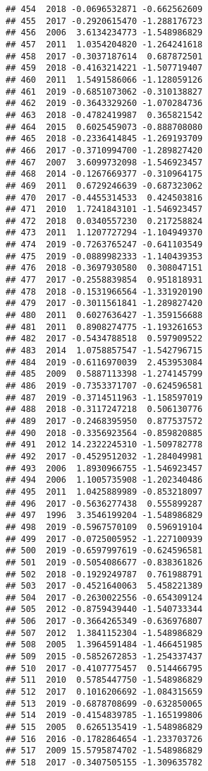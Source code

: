 \documentclass[
]{article}
\begin{document}
\begin{verbatim}
## 454  2018 -0.0696532871 -0.662562609
## 455  2017 -0.2920615470 -1.288176723
## 456  2006  3.6134234773 -1.548986829
## 457  2011  1.0354204820 -1.264241618
## 458  2017 -0.3037187614  0.687872501
## 459  2018 -0.4163214221 -1.507719407
## 460  2011  1.5491586066 -1.128059126
## 461  2019 -0.6851073062 -0.310138827
## 462  2019 -0.3643329260 -1.070284736
## 463  2018 -0.4782419987  0.365821542
## 464  2015  0.6025459073 -0.888708080
## 465  2018 -0.2336414845 -1.269193709
## 466  2017 -0.3710994700 -1.289827420
## 467  2007  3.6099732098 -1.546923457
## 468  2014 -0.1267669377 -0.310964175
## 469  2011  0.6729246639 -0.687323062
## 470  2017 -0.4455314533  0.424503816
## 471  2010  1.7241843101 -1.546923457
## 472  2018  0.0340557230  0.217258824
## 473  2011  1.1207727294 -1.104949370
## 474  2019 -0.7263765247 -0.641103549
## 475  2019 -0.0889982333 -1.140439353
## 476  2018 -0.3697930580  0.308047151
## 477  2017 -0.2558839854  0.951818931
## 478  2018 -0.1531966564 -1.331920190
## 479  2017 -0.3011561841 -1.289827420
## 480  2011  0.6027636427 -1.359156688
## 481  2011  0.8908274775 -1.193261653
## 482  2017 -0.5434788518  0.597909522
## 483  2014  1.0758857547 -1.542796715
## 484  2019 -0.6116970039  2.453953084
## 485  2009  0.5887113398 -1.274145799
## 486  2019 -0.7353371707 -0.624596581
## 487  2019 -0.3714511963 -1.158597019
## 488  2018 -0.3117247218  0.506130776
## 489  2017 -0.2468395950  0.877537572
## 490  2018 -0.3356923564 -0.859820885
## 491  2012 14.2322245310 -1.509782778
## 492  2017 -0.4529512032 -1.284049981
## 493  2006  1.8930966755 -1.546923457
## 494  2006  1.1005735908 -1.202340486
## 495  2011  1.0425889989 -0.853218097
## 496  2017 -0.5636277438  0.555899287
## 497  1996  3.3546199204 -1.548986829
## 498  2019 -0.5967570109  0.596919104
## 499  2017 -0.0725005952 -1.227100939
## 500  2019 -0.6597997619 -0.624596581
## 501  2019 -0.5054086677 -0.838361826
## 502  2018 -0.1929249787  0.761988791
## 503  2017 -0.4521640063  5.458221389
## 504  2017 -0.2630022556 -0.654309124
## 505  2012 -0.8759439440 -1.540733344
## 506  2017 -0.3664265349 -0.636976807
## 507  2012  1.3841152304 -1.548986829
## 508  2005  1.3964591484 -1.466451985
## 509  2015 -0.5852672853 -1.254337437
## 510  2017 -0.4107775457  0.514466795
## 511  2010  0.5785447750 -1.548986829
## 512  2017  0.1016206692 -1.084315659
## 513  2019 -0.6878708699 -0.632850065
## 514  2019 -0.4154839785 -1.165199806
## 515  2005  0.6265135419 -1.548986829
## 516  2016 -0.1782864654 -1.233703726
## 517  2009 15.5795874702 -1.548986829
## 518  2017 -0.3407505155 -1.309635782

\end{verbatim}
\end{document}
